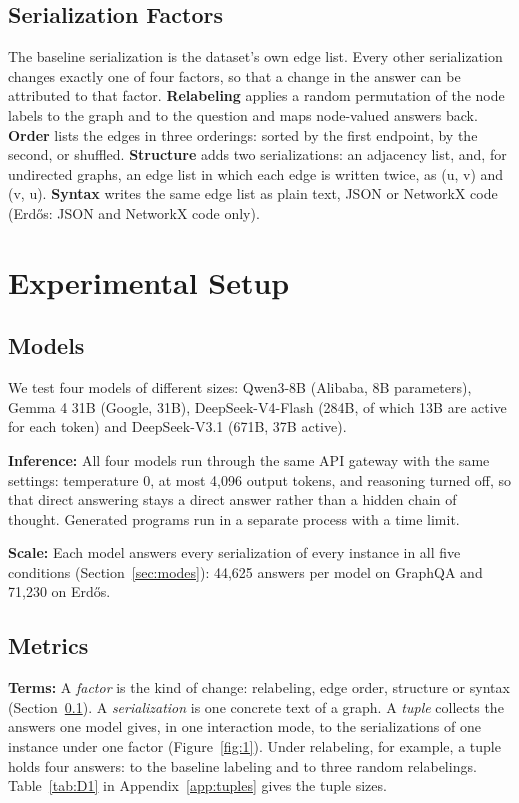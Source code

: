 \documentclass[11pt]{article}
\begin{document}
\subsection{Serialization Factors}\label{sec:factors}

The baseline serialization is the dataset's own edge list. Every other serialization changes exactly one of four factors, so that a change in the answer can be attributed to that factor. \textbf{Relabeling} applies a random permutation of the node labels to the graph and to the question and maps node-valued answers back. \textbf{Order} lists the edges in three orderings: sorted by the first endpoint, by the second, or shuffled. \textbf{Structure} adds two serializations: an adjacency list, and, for undirected graphs, an edge list in which each edge is written twice, as (u, v) and (v, u). \textbf{Syntax} writes the same edge list as plain text, JSON or NetworkX code (Erdős: JSON and NetworkX code only).

\section{Experimental Setup}

\subsection{Models}

We test four models of different sizes: Qwen3-8B (Alibaba, 8B parameters), Gemma 4 31B (Google, 31B), DeepSeek-V4-Flash (284B, of which 13B are active for each token) and DeepSeek-V3.1 (671B, 37B active).

\textbf{Inference:} All four models run through the same API gateway with the same settings: temperature 0, at most 4,096 output tokens, and reasoning turned off, so that direct answering stays a direct answer rather than a hidden chain of thought. Generated programs run in a separate process with a time limit.

\textbf{Scale:} Each model answers every serialization of every instance in all five conditions (Section~\ref{sec:modes}): 44,625 answers per model on GraphQA and 71,230 on Erdős.

\subsection[Metrics]{Metrics}\label{sec:metrics}

\textbf{Terms:} A \emph{factor} is the kind of change: relabeling, edge order, structure or syntax (Section~\ref{sec:factors}). A \emph{serialization} is one concrete text of a graph. A \emph{tuple} collects the answers one model gives, in one interaction mode, to the serializations of one instance under one factor (Figure~\ref{fig:1}). Under relabeling, for example, a tuple holds four answers: to the baseline labeling and to three random relabelings. Table~\ref{tab:D1} in Appendix~\ref{app:tuples} gives the tuple sizes.
\end{document}
